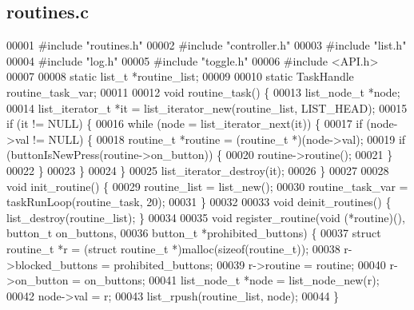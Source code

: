 \subsection{routines.\+c}
\label{a00140_source}

\begin{DoxyCode}
00001 \textcolor{preprocessor}{#include "routines.h"}
00002 \textcolor{preprocessor}{#include "controller.h"}
00003 \textcolor{preprocessor}{#include "list.h"}
00004 \textcolor{preprocessor}{#include "log.h"}
00005 \textcolor{preprocessor}{#include "toggle.h"}
00006 \textcolor{preprocessor}{#include <API.h>}
00007 
00008 \textcolor{keyword}{static} list_t *routine_list;
00009 
00010 \textcolor{keyword}{static} TaskHandle routine_task_var;
00011 
00012 \textcolor{keywordtype}{void} routine_task() \{
00013   list_node_t *node;
00014   list_iterator_t *it = list_iterator_new(routine\_list, LIST_HEAD);
00015   \textcolor{keywordflow}{if} (it != NULL) \{
00016     \textcolor{keywordflow}{while} (node = list_iterator_next(it)) \{
00017       \textcolor{keywordflow}{if} (node->val != NULL) \{
00018         routine_t *routine = (routine_t *)(node->val);
00019         \textcolor{keywordflow}{if} (buttonIsNewPress(routine->on_button)) \{
00020           routine->routine();
00021         \}
00022       \}
00023     \}
00024   \}
00025   list_iterator_destroy(it);
00026 \}
00027 
00028 \textcolor{keywordtype}{void} init_routine() \{
00029   routine\_list = list_new();
00030   routine_task_var = taskRunLoop(routine_task, 20);
00031 \}
00032 
00033 \textcolor{keywordtype}{void} deinit_routines() \{ list_destroy(routine\_list); \}
00034 
00035 \textcolor{keywordtype}{void} register_routine(\textcolor{keywordtype}{void} (*routine)(), button_t on\_buttons,
00036                       button_t *prohibited\_buttons) \{
00037   \textcolor{keyword}{struct }routine_t *r = (\textcolor{keyword}{struct }routine_t *)malloc(\textcolor{keyword}{sizeof}(routine_t));
00038   r->blocked_buttons = prohibited\_buttons;
00039   r->routine = routine;
00040   r->on_button = on\_buttons;
00041   list_node_t *node = list_node_new(r);
00042   node->val = r;
00043   list_rpush(routine\_list, node);
00044 \}
\end{DoxyCode}
